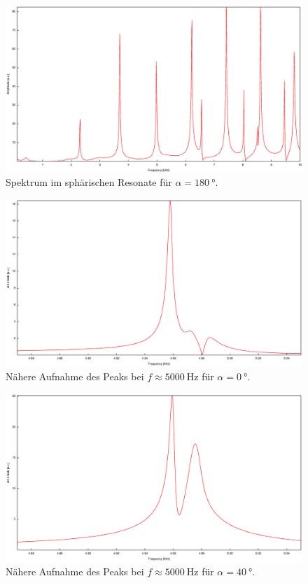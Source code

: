 \begin{figure}
\centering
\includegraphics[scale=0.35]{FP-V23data/2.1_180degree.eps}
\caption{Spektrum im sphärischen Resonate für $\alpha=\SI{180}{\degree}$.}
\label{fig:Overview2}
\end{figure}
\begin{figure}
\centering
\includegraphics[scale=0.35]{FP-V23data/2.2_0degree.eps}
\caption{Nähere Aufnahme des Peaks bei $f\approx\SI{5000}{\hertz}$ für $\alpha=\SI{0}{\degree}$.}
\label{fig:5k_Peak1}
\end{figure}
\begin{figure}
\centering
\includegraphics[scale=0.35]{FP-V23data/2.2_40degree.eps}
\caption{Nähere Aufnahme des Peaks bei $f\approx\SI{5000}{\hertz}$ für $\alpha=\SI{40}{\degree}$.}
\label{fig:5k_Peak2}
\end{figure}
